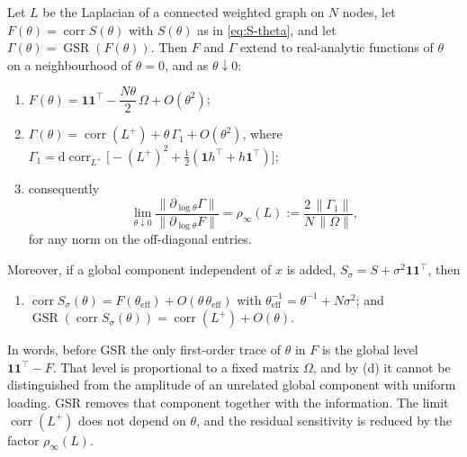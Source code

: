 \begin{proposition}\label{prop:gsr}
Let $L$ be the Laplacian of a connected weighted graph on $N$ nodes, let $F(\theta)=\operatorname{corr}S(\theta)$
with $S(\theta)$ as in \eqref{eq:S-theta}, and let $\Gamma(\theta)=\operatorname{GSR}(F(\theta))$. Then
$F$ and $\Gamma$ extend to real-analytic functions of $\theta$ on a neighbourhood of $\theta=0$, and as
$\theta\downarrow0$:
\begin{enumerate}
  \item[(a)] $F(\theta)=\mathbf 1\mathbf 1^{\top}-\dfrac{N\theta}{2}\,\Omega+O(\theta^{2})$;
  \item[(b)] $\Gamma(\theta)=\operatorname{corr}(L^{+})+\theta\,\Gamma_1+O(\theta^{2})$, where
  $\Gamma_1=\mathrm d\operatorname{corr}_{L^{+}}\bigl[-(L^{+})^{2}+\tfrac12(\mathbf 1h^{\top}+h\mathbf 1^{\top})\bigr]$;
  \item[(c)] consequently
  \[
    \lim_{\theta\downarrow0}
    \frac{\|\partial_{\log\theta}\Gamma\|}{\|\partial_{\log\theta}F\|}
    =\rho_\infty(L):=\frac{2\,\|\Gamma_1\|}{N\,\|\Omega\|},
  \]
  for any norm on the off-diagonal entries.
\end{enumerate}
Moreover, if a global component independent of $x$ is added, $S_\sigma=S+\sigma^{2}\mathbf 1\mathbf 1^{\top}$,
then
\begin{enumerate}
  \item[(d)] $\operatorname{corr}S_\sigma(\theta)=F(\theta_{\mathrm{eff}})+O(\theta\,\theta_{\mathrm{eff}})$ with
  $\theta_{\mathrm{eff}}^{-1}=\theta^{-1}+N\sigma^{2}$; and
  $\operatorname{GSR}(\operatorname{corr}S_\sigma(\theta))=\operatorname{corr}(L^{+})+O(\theta)$.
\end{enumerate}
\end{proposition}

In words, before GSR the only first-order trace of $\theta$ in $F$ is the global level
$\mathbf 1\mathbf 1^{\top}-F$. That level is proportional to a fixed matrix $\Omega$, and by (d) it
cannot be distinguished from the amplitude of an unrelated global component with uniform loading.
GSR removes that component together with the information. The limit $\operatorname{corr}(L^{+})$ does not depend on
$\theta$, and the residual sensitivity is reduced by the factor $\rho_\infty(L)$.

